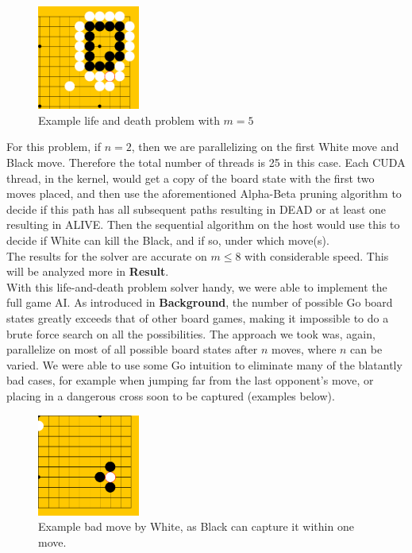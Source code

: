 \documentclass[11pt]{article}
\begin{document}
\begin{figure}[H]
    \centering
    \includegraphics[width=0.3\textwidth]{ld_pro_1.png}
    \caption{Example life and death problem with $m = 5$}
\end{figure}
For this problem, if $n = 2$, then we are parallelizing on the first White move and Black move. Therefore the total number of threads is 25 in this case. Each CUDA thread, in the kernel, would get a copy of the board state with the first two moves placed, and then use the aforementioned Alpha-Beta pruning algorithm to decide if this path has all subsequent paths resulting in DEAD or at least one resulting in ALIVE. Then the sequential algorithm on the host would use this to decide if White can kill the Black, and if so, under which move(s). \\
The results for the solver are accurate on $m \leq 8$ with considerable speed. This will be analyzed more in \textbf{Result}. \\
With this life-and-death problem solver handy, we were able to implement the full game AI. As introduced in \textbf{Background}, the number of possible Go board states greatly exceeds that of other board games, making it impossible to do a brute force search on all the possibilities. The approach we took was, again, parallelize on most of all possible board states after $n$ moves, where $n$ can be varied. We were able to use some Go intuition to eliminate many of the blatantly bad cases, for example when jumping far from the last opponent's move, or placing in a dangerous cross soon to be captured (examples below).
\begin{figure}[H]
    \centering
    \includegraphics[width=0.3\textwidth]{bad_1.png}
    \caption{Example bad move by White, as Black can capture it within one move.}
\end{figure}
\end{document}
